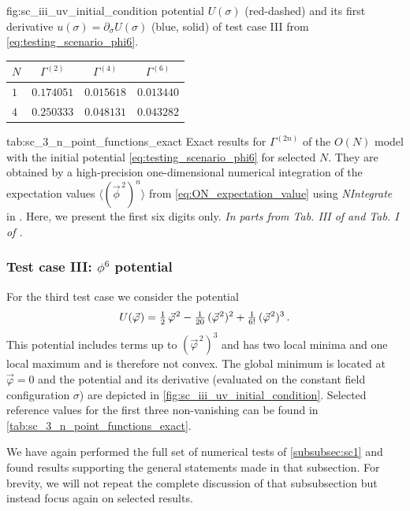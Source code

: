 	{fig:sc_iii_uv_initial_condition} %
	{%
		\uv{} potential $U ( \sigma )$ (red-dashed) and its first derivative $u ( \sigma ) = \partial_\sigma U ( \sigma )$ (blue, solid) of test case III from \cref{eq:testing_scenario_phi6}. 
	} %
	{%
		\renewcommand{\arraystretch}{1.15}
		\small
		\begin{tabular}{l c c c}
			\toprule
			$N$		&	$\Gamma^{(2)}$	&	$\Gamma^{(4)}$	&	$\Gamma^{(6)}$	\\
			\midrule
				$1$	&	$0.174051$	&	$0.015618$	&	$0.013440$\\
				$4$	&	$0.250333$	&	$0.048131$	&	$0.043282$\\
			\bottomrule
		\end{tabular}
	} %
	{tab:sc_3_n_point_functions_exact}%
	{%
		Exact results for $\Gamma^{(2n)}$ of the $O(N)$ model with the \uv{} initial potential \eqref{eq:testing_scenario_phi6} for selected $N$.
		They are obtained by a high-precision one-dimensional numerical integration of the expectation values $\langle ( \vec{\phi}^{\, 2} )^n \rangle$ from \cref{eq:ON_expectation_value} using \textit{NIntegrate} in \WAMXIIwR{}.
		Here, we present the first six digits only.
		\textit{In parts from Tab. III of  and Tab. I of .}%
	} %
\subsubsection{Test case III: \texorpdfstring{$\phi^6$}{phi**6} potential}
\label{subsubsec:sc3}
For the third test case we consider the potential
\begin{align}
	U ( \vec{\varphi} \mskip1.0mu ) = \tfrac{1}{2} \, \vec{\varphi}^{\mskip1.0mu 2} - \tfrac{1}{20} \, ( \vec{\varphi}^{\mskip1.0mu 2} )^2 + \tfrac{1}{6!} \, ( \vec{\varphi}^{\mskip1.0mu 2} )^3\, .	\label{eq:testing_scenario_phi6}
\end{align}
This potential includes terms up to $( \vec{\varphi}^{\, 2} )^3$ and has two local minima and one local maximum and is therefore not convex.
The global minimum is located at $\vec{\varphi} = 0$ and the potential and its derivative (evaluated on the constant field configuration $\sigma$) are depicted in \cref{fig:sc_iii_uv_initial_condition}.
Selected reference values for the first three non-vanishing \nptFunctions{} can be found in \cref{tab:sc_3_n_point_functions_exact}.

We have again performed the full set of numerical tests of \cref{subsubsec:sc1} and found results supporting the general statements made in that subsection.
For brevity, we will not repeat the complete discussion of that subsubsection but instead focus again on selected results.\bigskip


